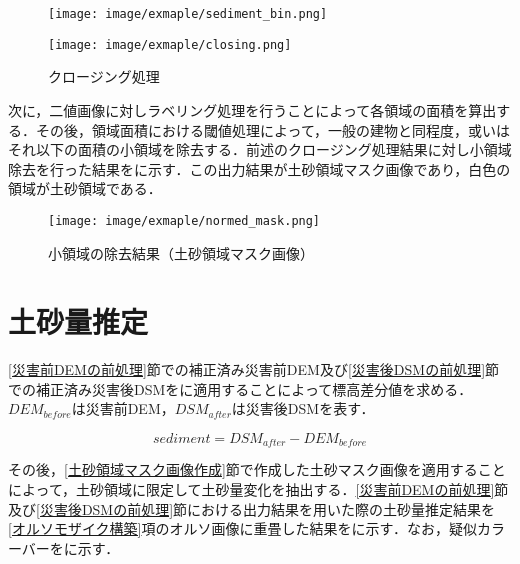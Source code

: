       \begin{figure}[tbp]
        \begin{minipage}[c]{0.5\hsize}
          \centering
          \texttt{[image: image/exmaple/sediment\_bin.png]}
        \end{minipage}
        \begin{minipage}[c]{0.45\hsize}
          \centering
          \texttt{[image: image/exmaple/closing.png]}
        \end{minipage}
        \caption{クロージング処理}
        \label{クロージング処理結果}
      \end{figure}

      次に，二値画像に対しラベリング処理を行うことによって各領域の面積を算出する．その後，領域面積における閾値処理によって，一般の建物と同程度，或いはそれ以下の面積の小領域を除去する．前述のクロージング処理結果に対し小領域除去を行った結果をに示す．この出力結果が土砂領域マスク画像であり，白色の領域が土砂領域である．
      
      \begin{figure}[tbp]
        \centering
        \texttt{[image: image/exmaple/normed\_mask.png]}
        \caption{小領域の除去結果（土砂領域マスク画像）}
        \label{小領域除去}
      \end{figure}



  \section{土砂量推定}
    \label{土砂量推定}
    \ref{災害前DEMの前処理}節での補正済み災害前DEM及び\ref{災害後DSMの前処理}節での補正済み災害後DSMをに適用することによって標高差分値を求める．$DEM_{before}$は災害前DEM，$DSM_{after}$は災害後DSMを表す．
    
    \begin{equation}
      \label{土砂量推定式}
      sediment = DSM_{after} - DEM_{before}
    \end{equation}

    その後，\ref{土砂領域マスク画像作成}節で作成した土砂マスク画像を適用することによって，土砂領域に限定して土砂量変化を抽出する．\ref{災害前DEMの前処理}節及び\ref{災害後DSMの前処理}節における出力結果を用いた際の土砂量推定結果を\ref{オルソモザイク構築}項のオルソ画像に重畳した結果をに示す．なお，疑似カラーバーをに示す．

